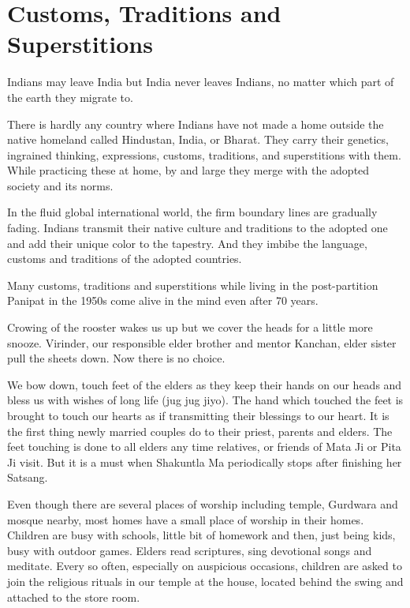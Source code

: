\chapter{Customs, Traditions and Superstitions}

Indians may leave India but India never leaves Indians, no matter which
part of the earth they migrate to. 

There is hardly any country where Indians have not made a home outside the
native homeland called Hindustan, India, or Bharat. They carry their
genetics, ingrained thinking, expressions, customs, traditions, and
superstitions with them. While practicing these at home, by and large they
merge with the adopted society and its norms. 

In the fluid global international world, the firm boundary lines are
gradually fading. Indians transmit their native culture and traditions to
the adopted one and add their unique color to the tapestry. And they
imbibe the language, customs and traditions of the adopted countries. 

Many customs, traditions and superstitions while living in the
post-partition Panipat in the 1950s come alive in the mind even after 70
years. 

Crowing of the rooster wakes us up but we cover the heads for a little
more snooze. Virinder, our responsible elder brother and mentor Kanchan,
elder sister pull the sheets down. Now there is no choice. 

We bow down, touch feet of the elders as they keep their hands on our
heads and bless us with wishes of long life (jug jug jiyo). The hand which
touched the feet is brought to touch our hearts as if transmitting their
blessings to our heart. It is the first thing newly married couples do to
their priest, parents and elders. The feet touching is done to all elders
any time relatives, or friends of Mata Ji or Pita Ji visit. But it is
a must when Shakuntla Ma periodically stops after finishing her Satsang. 

Even though there are several places of worship including temple, Gurdwara
and mosque nearby, most homes have a small place of worship in their
homes. Children are busy with schools, little bit of homework and then,
just being kids, busy with outdoor games. Elders read scriptures, sing
devotional songs and meditate. Every so often, especially on auspicious
occasions, children are asked to join the religious rituals in our temple
at the house, located behind the swing and attached to the store room. 


